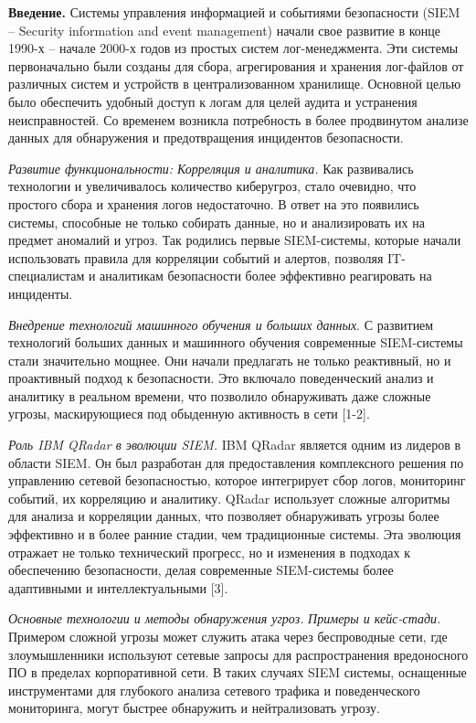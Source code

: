\begin{multicols}{2}
{\bfseries Введение.} Системы управления информацией и событиями
безопасности (SIEM -- Security information and event management) начали
свое развитие в конце 1990-х -- начале 2000-х годов из простых систем
лог-менеджмента. Эти системы первоначально были созданы для сбора,
агрегирования и хранения лог-файлов от различных систем и устройств в
централизованном хранилище. Основной целью было обеспечить удобный
доступ к логам для целей аудита и устранения неисправностей. Со временем
возникла потребность в более продвинутом анализе данных для обнаружения
и предотвращения инцидентов безопасности.

\emph{Развитие функциональности: Корреляция и аналитика.} Как
развивались технологии и увеличивалось количество киберугроз, стало
очевидно, что простого сбора и хранения логов недостаточно. В ответ на
это появились системы, способные не только собирать данные, но и
анализировать их на предмет аномалий и угроз. Так родились первые
SIEM-системы, которые начали использовать правила для корреляции событий
и алертов, позволяя IT-специалистам и аналитикам безопасности более
эффективно реагировать на инциденты.

\emph{Внедрение технологий машинного обучения и больших данных}. С
развитием технологий больших данных и машинного обучения современные
SIEM-системы стали значительно мощнее. Они начали предлагать не только
реактивный, но и проактивный подход к безопасности. Это включало
поведенческий анализ и аналитику в реальном времени, что позволило
обнаруживать даже сложные угрозы, маскирующиеся под обыденную активность
в сети {[}1-2{]}.

\emph{Роль IBM QRadar в эволюции SIEM.} IBM QRadar является одним из
лидеров в области SIEM. Он был разработан для предоставления
комплексного решения по управлению сетевой безопасностью, которое
интегрирует сбор логов, мониторинг событий, их корреляцию и аналитику.
QRadar использует сложные алгоритмы для анализа и корреляции данных, что
позволяет обнаруживать угрозы более эффективно и в более ранние стадии,
чем традиционные системы. Эта эволюция отражает не только технический
прогресс, но и изменения в подходах к обеспечению безопасности, делая
современные SIEM-системы более адаптивными и интеллектуальными {[}3{]}.

\emph{Основные технологии и методы обнаружения угроз.} \emph{Примеры и
кейс-стади.} Примером сложной угрозы может служить атака через
беспроводные сети, где злоумышленники используют сетевые запросы для
распространения вредоносного ПО в пределах корпоративной сети. В таких
случаях SIEM системы, оснащенные инструментами для глубокого анализа
сетевого трафика и поведенческого мониторинга, могут быстрее обнаружить
и нейтрализовать угрозу.


\end{multicols}
